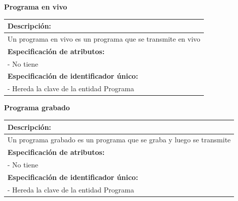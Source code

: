 \documentclass[a4paper,10pt]{article}
\begin{document}
  \begin{flushleft}
      \begin{large} \bf{Programa en vivo} \end{large}
    \end{flushleft}
      \begin{tabular}{| p{2cm} | p{9cm} |}
	\hline
	\multicolumn{2}{|l|}{\bf{Descripci\'on:}} \\
	\hline
	\multicolumn{2}{|l|}{Un programa en vivo es un programa que se transmite en vivo} \\
	\hline	
	\multicolumn{2}{|l|}{\bf{Especificaci\'on de atributos:}} \\
	\hline
	- No tiene & \\
	\hline
	\multicolumn{2}{|l|}{\bf{Especificaci\'on de identificador \'unico:}} \\
	\hline
	\multicolumn{2}{|l|}{- Hereda la clave de la entidad Programa} \\
	\hline
      \end{tabular} 
  
  \begin{flushleft}
      \begin{large} \bf{Programa grabado} \end{large}
    \end{flushleft}
      \begin{tabular}{| p{2cm} | p{9cm} |}
	\hline
	\multicolumn{2}{|l|}{\bf{Descripci\'on:}} \\
	\hline
	\multicolumn{2}{|l|}{Un programa grabado es un programa que se graba y luego se transmite} \\
	\hline	
	\multicolumn{2}{|l|}{\bf{Especificaci\'on de atributos:}} \\
	\hline
	- No tiene & \\
	\hline
	\multicolumn{2}{|l|}{\bf{Especificaci\'on de identificador \'unico:}} \\
	\hline
	\multicolumn{2}{|l|}{- Hereda la clave de la entidad Programa} \\
	\hline
      \end{tabular}
      
\end{document}
